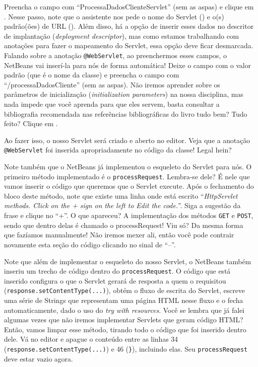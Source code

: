 Preencha o campo  com ``ProcessaDadosClienteServlet'' (sem as aspas) e clique em . Nesse passo, note que o assistente nos pede o nome do Servlet () e o(s) padrão(ões) de URL (). Além disso, há a opção de inserir esses dados no descritor de implantação (\textit{deployment descriptor}), mas como estamos trabalhando com anotações para fazer o mapeamento do Servlet, essa opção deve ficar desmarcada. Falando sobre a anotação \texttt{@WebServlet}, ao preenchermos esses campos, o NetBeans vai inserí-la para nós de forma automática! Deixe o campo  com o valor padrão (que é o nome da classe) e preencha o campo  com ``/processaDadosCliente'' (sem as aspas). Não iremos aprender sobre os parâmetros de inicialização (\textit{initialization parameters}) na nossa disciplina, mas nada impede que você aprenda para que eles servem, basta consultar a bibliografia recomendada nas referências bibliográficas do livro tudo bem? Tudo feito? Clique em .

Ao fazer isso, o nosso Servlet será criado e aberto no editor. Veja que a anotação \texttt{@WebServlet} foi inserida apropriadamente no código da classe! Legal hein?

Note também que o NetBeans já implementou o esqueleto do Servlet para nós. O primeiro método implementado é o \texttt{processRequest}. Lembra-se dele? É nele que vamos inserir o código que queremos que o Servlet execute. Após o fechamento do bloco deste método, note que existe uma linha onde está escrito ``\textit{HttpServlet methods. Click on the + sign on the left to Edit the code.}''. Siga a sugestão da frase e clique no ``+''. O que apareceu? A implementação dos métodos \texttt{GET} e \texttt{POST}, sendo que dentro delas é chamado o processRequest! Viu só? Da mesma forma que fazíamos manualmente! Não iremos mexer ali, então você pode contrair novamente esta seção do código clicando no sinal de ``–''.

Note que além de implementar o esqueleto do nosso Servlet, o NetBeans também inseriu um trecho de código dentro do \texttt{processRequest}. O código que está inserido configura o que o Servlet gerará de resposta a quem o requisitou (\texttt{response.setContentType(...)}), obtém o fluxo de escrita do Servlet, escreve uma série de Strings que representam uma página HTML nesse fluxo e o fecha automaticamente, dado o uso do \textit{try with resources}. Você se lembra que já falei algumas vezes que não iremos implementar Servlets que geram código HTML? Então, vamos limpar esse método, tirando todo o código que foi inserido dentro dele. Vá no editor e apague o conteúdo entre as linhas 34 (\texttt{response.setContentType(...)}) e 46 (\texttt{\}}), incluindo elas. Seu \texttt{processRequest} deve estar vazio agora.

